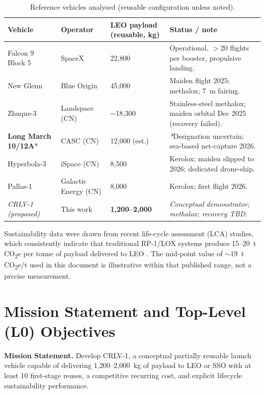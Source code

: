 \documentclass[10pt,a4paper]{article}
\begin{document}
\begin{table}[H]
\centering
\caption{Reference vehicles analysed (reusable configuration unless noted).}
\label{tab:refs}
\small
\begin{tabular}{@{}p{4.0cm}p{2.5cm}p{2.8cm}p{6.7cm}@{}}
\toprule
\textbf{Vehicle} & \textbf{Operator} & \textbf{LEO payload (reusable, kg)} & \textbf{Status / note} \\
\midrule
Falcon 9 Block 5        & SpaceX            & 22,800    & Operational, $>$20 flights per booster, propulsive landing. \\
New Glenn               & Blue Origin       & 45,000    & Maiden flight 2025; methalox; 7~m fairing. \\
Zhuque-3                & Landspace (CN)    & $\sim$18,300 & Stainless-steel methalox; maiden orbital Dec 2025 (recovery failed). \\
\textbf{Long March 10/12A}* & CASC (CN)     & 12,000 (est.) & \textit{*}Designation uncertain; sea-based net-capture 2026. \\
Hyperbola-3             & iSpace (CN)       & 8,500     & Kerolox; maiden slipped to 2026; dedicated drone-ship. \\
Pallas-1                & Galactic Energy (CN) & 8,000   & Kerolox; first flight 2026. \\
\midrule
\textit{CRLV-1 (proposed)} & This work      & \textbf{1,200--2,000} & \textit{Conceptual demonstrator; methalox; recovery TBD.} \\
\bottomrule
\end{tabular}
\end{table}

Sustainability data were drawn from recent life-cycle assessment (LCA) studies, which consistently indicate that traditional RP-1/LOX systems produce 15--20~t CO\textsubscript{2}e per tonne of payload delivered to LEO \cite{lca2024,lca2025}. The mid-point value of $\sim$19~t CO\textsubscript{2}e/t used in this document is illustrative within that published range, not a precise measurement.

\section{Mission Statement and Top-Level (L0) Objectives}
\textbf{Mission Statement.} Develop CRLV-1, a conceptual partially reusable launch vehicle capable of delivering 1{,}200--2{,}000~kg of payload to LEO or SSO with at least 10 first-stage reuses, a competitive recurring cost, and explicit lifecycle sustainability performance.
\end{document}
